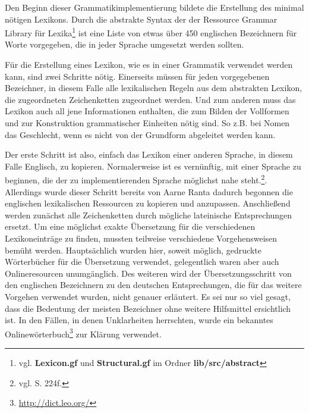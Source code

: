 Den Beginn dieser Grammatikimplementierung bildete die Erstellung des minimal nötigen Lexikons. Durch die abstrakte Syntax der der Ressource Grammar Library für Lexika\footnote{vgl. \textbf{Lexicon.gf} und \textbf{Structural.gf} im Ordner \textbf{lib/src/abstract}} ist eine Liste von etwas über 450 englischen Bezeichnern für Worte vorgegeben, die in jeder Sprache umgesetzt werden sollten. \par
Für die Erstellung eines Lexikon, wie es in einer Grammatik verwendet werden kann, sind zwei Schritte nötig. Einerseits müssen für jeden vorgegebenen Bezeichner, in diesem Falle alle lexikalischen Regeln aus dem abstrakten Lexikon, die zugeordneten Zeichenketten zugeordnet werden. Und zum anderen muss das Lexikon auch all jene Informationen enthalten, die zum Bilden der Vollformen und zur Konstruktion grammatischer Einheiten nötig sind. So z.B. bei Nomen das Geschlecht, wenn es nicht von der Grundform abgeleitet werden kann. \par
Der erste Schritt ist also, einfach das Lexikon einer anderen Sprache, in diesem Falle Englisch, zu kopieren. Normalerweise ist es vernünftig, mit einer Sprache zu beginnen, die der zu implementierenden Sprache möglichst nahe steht.\footnote{vgl. \cite{RANTA2011} S. 224f.}. Allerdings wurde dieser Schritt bereits von Aarne Ranta dadurch begonnen die englischen lexikalischen Ressourcen zu kopieren und anzupassen. Anschließend werden zunächst alle Zeichenketten durch mögliche lateinische Entsprechungen ersetzt. Um eine möglichst exakte Übersetzung für die verschiedenen Lexikoneinträge zu finden, mussten teilweise verschiedene Vorgehensweisen bemüht werden. Hauptsächlich wurden hier, soweit möglich, gedruckte Wörterbücher für die Übersetzung verwendet, gelegentlich waren aber auch Onlineresourcen unumgänglich. Des weiteren wird der Übersetzungsschritt von den englischen Bezeichnern zu den deutschen Entsprechungen, die für das weitere Vorgehen verwendet wurden, nicht genauer erläutert. Es sei nur so viel gesagt, dass die Bedeutung der meisten Bezeichner ohne weitere Hilfsmittel ersichtlich ist. In den Fällen, in denen Unklarheiten herrschten, wurde ein bekanntes Onlinewörterbuch\footnote{\url{http://dict.leo.org/}} zur Klärung verwendet.\par
